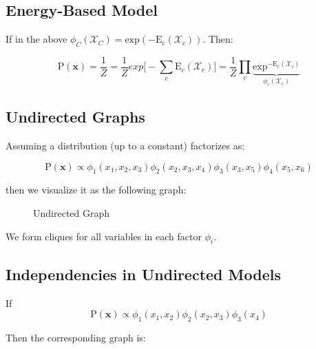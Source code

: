 \documentclass{article}
\newcommand{\prob}{\text{P}}
\newcommand{\pr}{\prob}
\renewcommand{\vec}[1]{\mathbf{#1}}
\newcommand{\bx}{\vec{x}}
\begin{document}
\subsection{Energy-Based Model}
If in the above $\phi_C(\mathcal{X}_C) = \text{exp} (- \text{E}_c(\mathcal{X}_c))$. Then:

$$
    \pr(\bx) = \frac{1}{Z} =
        \frac{1}{Z} exp \bigg[ - \sum_c \text{E}_c(\mathcal{X}_c) \bigg] =
        \frac{1}{Z} \prod_c \underbrace{\text{exp}^{
            -\text{E}_c(\mathcal{X}_c)
        }}_{\phi_c(\mathcal{X}_c)}
$$

\subsection{Undirected Graphs}
Assuming a distribution (up to a constant) factorizes as:

\begin{equation*}
    \pr(\bx) \propto \phi_1(x_1, x_2, x_3) \phi_2(x_2, x_3, x_4) \phi_3(x_3, x_5) \phi_4(x_5, x_6)
\end{equation*}

then we visualize it as the following graph:
\begin{figure}[h!]
    \centering
    \caption{Undirected Graph}
    \label{fig:ug}
\end{figure}

We form cliques for all variables in each factor $\phi_i$.

\subsection{Independencies in Undirected Models}
If
$$
    \pr(\bx) \propto \phi_1(x_1, x_2) \phi_2(x_2, x_3) \phi_3(x_4)
$$

Then the corresponding graph is:

\begin{center}
\end{center}
\end{document}
